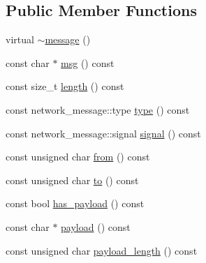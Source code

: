\subsection*{Public Member Functions}
\begin{DoxyCompactItemize}
\item 
virtual \hyperlink{classbattleship_1_1network__message_1_1message_a89d002562fcc64e39f35782e92c4d6e2}{$\sim$message} ()
\item 
const char $\ast$ \hyperlink{classbattleship_1_1network__message_1_1message_aa0c2c52cb41c9c524e9e785a8240c60c}{msg} () const
\item 
const size\+\_\+t \hyperlink{classbattleship_1_1network__message_1_1message_a522b961254d0359c6c68bd32875a5626}{length} () const
\item 
const network\+\_\+message\+::type \hyperlink{classbattleship_1_1network__message_1_1message_a19cd4318b0e70831ddbf340597d040a4}{type} () const
\item 
const network\+\_\+message\+::signal \hyperlink{classbattleship_1_1network__message_1_1message_a5709b3059dfb73e135dca1c6f248f797}{signal} () const
\item 
const unsigned char \hyperlink{classbattleship_1_1network__message_1_1message_af2ebed25f82de46c947a2241c6952563}{from} () const
\item 
const unsigned char \hyperlink{classbattleship_1_1network__message_1_1message_a36145cf7dfc9102da280adfad5d1a972}{to} () const
\item 
const bool \hyperlink{classbattleship_1_1network__message_1_1message_a2232a3db5d5244e5487968908c04b9f9}{has\+\_\+payload} () const
\item 
const char $\ast$ \hyperlink{classbattleship_1_1network__message_1_1message_ab42ddf52012135284f65641702459912}{payload} () const
\item 
const unsigned char \hyperlink{classbattleship_1_1network__message_1_1message_ac4a236888d40ffbdd8572660a3f34b1e}{payload\+\_\+length} () const
\end{DoxyCompactItemize}
